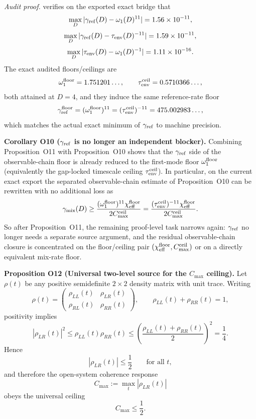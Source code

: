 \documentclass[aps,prd,onecolumn,notitlepage,nofootinbib,superscriptaddress,11pt,floatfix]{revtex4-2}
\begin{document}
\textit{Audit proof.}  verifies on the exported exact bridge that
\[
\max_D|\gamma_{\rm ref}(D)-\omega_1(D)^{11}|=1.56\times10^{-11},
\]
\[
\max_D|\gamma_{\rm ref}(D)-\tau_{\rm env}(D)^{-11}|=1.59\times10^{-11},
\]
\[
\max_D|\tau_{\rm env}(D)-\omega_1(D)^{-1}|=1.11\times10^{-16}.
\]
The exact audited floors/ceilings are
\[
\omega_1^{\rm floor}=1.751201\ldots,
\qquad
\tau_{\rm env}^{\rm ceil}=0.5710366\ldots,
\]
both attained at $D=4$, and they induce the same reference-rate floor
\[
\gamma_{\rm ref}^{\rm floor}
=
(\omega_1^{\rm floor})^{11}
=
(\tau_{\rm env}^{\rm ceil})^{-11}
=
475.002983\ldots,
\]
which matches the actual exact minimum of $\gamma_{\rm ref}$ to machine precision.

\medskip\noindent\textbf{Corollary O10 (\texorpdfstring{$\gamma_{\rm ref}$}{gamma_ref} is no longer an independent blocker).}
Combining Proposition~O11 with Proposition~O10 shows that the $\gamma_{\rm ref}$ side of the observable-chain floor is already reduced to the first-mode floor $\omega_1^{\rm floor}$ (equivalently the gap-locked timescale ceiling $\tau_{\rm env}^{\rm ceil}$). In particular, on the current exact export the separated observable-chain estimate of Proposition~O10 can be rewritten with no additional loss as
\[
\gamma_{\rm mix}(D)\ge
\frac{(\omega_1^{\rm floor})^{11}\chi_{\rm eff}^{\rm floor}}{2C_{\max}^{\rm ceil}}
=
\frac{(\tau_{\rm env}^{\rm ceil})^{-11}\chi_{\rm eff}^{\rm floor}}{2C_{\max}^{\rm ceil}}.
\]
So after Proposition~O11, the remaining proof-level task narrows again: $\gamma_{\rm ref}$ no longer needs a separate source argument, and the residual observable-chain closure is concentrated on the floor/ceiling pair $(\chi_{\rm eff}^{\rm floor},C_{\max}^{\rm ceil})$ or on a directly equivalent mix-rate floor.

\medskip\noindent\textbf{Proposition O12 (Universal two-level source for the \texorpdfstring{$C_{\max}$}{Cmax} ceiling).}
Let $\rho(t)$ be any positive semidefinite $2\times 2$ density matrix with unit trace. Writing
\[
\rho(t)=
\begin{pmatrix}
\rho_{LL}(t) & \rho_{LR}(t) \\
\rho_{RL}(t) & \rho_{RR}(t)
\end{pmatrix},
\qquad
\rho_{LL}(t)+\rho_{RR}(t)=1,
\]
positivity implies
\[
|\rho_{LR}(t)|^2 \le \rho_{LL}(t)\rho_{RR}(t)
\le
\left(\frac{\rho_{LL}(t)+\rho_{RR}(t)}{2}\right)^2
=\frac14.
\]
Hence
\[
|\rho_{LR}(t)|\le \frac12
\qquad\text{for all }t,
\]
and therefore the open-system coherence response
\[
C_{\max}:=\max_t |\rho_{LR}(t)|
\]
obeys the universal ceiling
\[
C_{\max}\le \frac12.
\]
\end{document}
